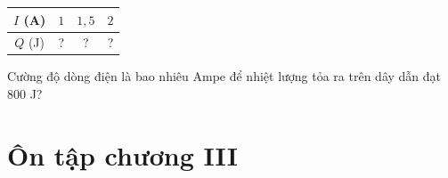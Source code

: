 \begin{exercises}
\begin{questions}[resume=SGK]
\begin{questions}
            \begin{center}
                \begin{tabular}{|c|c|c|c|}
                    \hline
                    $I$ (A) & $1$ & $1{,}5$ & $2$ \\
                    \hline
                    $Q$ (J) & ? & ? & ? \\
                    \hline
                \end{tabular}
            \end{center}

            \item Cường độ dòng điện là bao nhiêu Ampe để nhiệt lượng tỏa ra trên dây dẫn đạt $800$ J?
        \end{questions}
        \answerline
        \answerline
    \end{questions}
\end{exercises}

\section*{Ôn tập chương III}

